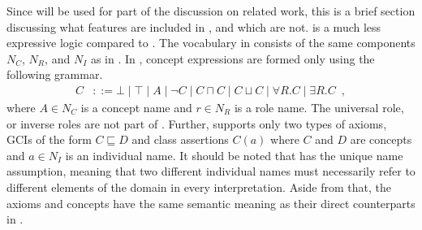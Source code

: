 Since \ALC will be used for part of the discussion on related work, this is a brief section discussing what features are included in \ALC, and which are not. \ALC is a much less expressive logic compared to \SROIQ. The vocabulary in \ALC consists of the same components $N_C$, $N_R$, and $N_I$ as in \SROIQ. In \ALC, concept expressions are formed only using the following grammar.
\begin{align*}
  C &::= \bot \mid \top \mid A \mid \neg C \mid C \sqcap C \mid C \sqcup C \mid \forall R.C \mid \exists R.C \enspace,
\end{align*}
where $A \in N_C$ is a concept name and $r \in N_R$ is a role name. The universal role, or inverse roles are not part of \ALC. Further, \ALC supports only two types of axioms, GCIs of the form $C \sqsubseteq D$ and class assertions $C(a)$ where $C$ and $D$ are concepts and $a \in N_I$ is an individual name. It should be noted that \ALC has the unique name assumption, meaning that two different individual names must necessarily refer to different elements of the domain in every interpretation. Aside from that, the axioms and concepts have the same semantic meaning as their direct counterparts in \SROIQ.

